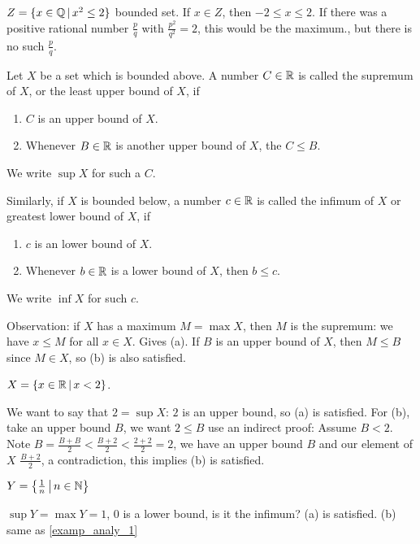 \documentclass[10pt, a4paper]{article}
\begin{document}
\begin{example}
    $Z = \{x \in \mathbb{Q}\,|\, x ^ 2 \leq 2\}$ bounded set.
    If $x \in Z$,
    then $-2 \leq x \leq 2$.
    If there was a positive rational number $\frac{p}{q}$ with $\frac{p ^ 2}{q ^ 2} = 2$,
    this would be the maximum.,
    but there is no such $\frac{p}{q}$.
\end{example}

\begin{definition}
    Let $X$ be a set which is bounded above.
    A number $C \in \mathbb{R}$ is called the supremum of $X$,
    or the least upper bound of $X$, if
    \begin{enumerate}[label = (\alph*)]
        \item $C$ is an upper bound of $X$.
        \item Whenever $B \in \mathbb{R}$ is another upper bound of $X$, the $C \leq B$.
    \end{enumerate}
    We write $\sup X$ for such a $C$.
    
    Similarly, if $X$ is bounded below,
    a number $c \in \mathbb{R}$ is called the infimum of $X$ or greatest lower bound of $X$, if
    \begin{enumerate}[label = (\alph*)]
        \item $c$ is an lower bound of $X$.
        \item Whenever $b \in \mathbb{R}$ is a lower bound of $X$, then $b \leq c$.
    \end{enumerate}
    We write $\inf X$ for such $c$.
\end{definition}

Observation: if $X$ has a maximum $M = \max X$,
then $M$ is the supremum:
we have $x \leq M$ for all $x \in X$.
Gives (a).
If $B$ is an upper bound of $X$,
then $M \leq B$ since $M \in X$,
so (b) is also satisfied.

\begin{example}
    $X = \{x \in \mathbb{R}\,|\, x < 2\}$.

    We want to say that $2 = \sup X$:
    $2$ is an upper bound,
    so (a) is satisfied.
    For (b), take an upper bound $B$,
    we want $2 \leq B$
    use an indirect proof:
    Assume $B < 2$.
    Note $B = \frac{B + B}{2} < \frac{B + 2}{2} < \frac{2 + 2}{2} = 2$,
    we have an upper bound $B$ and our element of $X$ $\frac{B + 2}{2}$,
    a contradiction,
    this implies (b) is satisfied.
\end{example}

\begin{example}\label{examp_analy_2}
    $Y = \left\{\frac{1}{n}\,\middle|\, n \in \mathbb{N}\right\}$

    $\sup Y = \max Y = 1$,
    $0$ is a lower bound,
    is it the infimum?
    (a) is satisfied.
    (b) same as \autoref{examp_analy_1}
\end{example}
\end{document}
